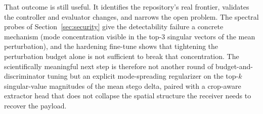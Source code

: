 \documentclass[journal]{IEEEtran}
\begin{document}
That outcome is still useful. It identifies the repository's real frontier, validates the controller and evaluator changes, and narrows the open problem. The spectral probes of Section~\ref{sec:security} give the detectability failure a concrete mechanism (mode concentration visible in the top-3 singular vectors of the mean perturbation), and the hardening fine-tune shows that tightening the perturbation budget alone is not sufficient to break that concentration. The scientifically meaningful next step is therefore not another round of budget-and-discriminator tuning but an explicit mode-spreading regularizer on the top-$k$ singular-value magnitudes of the mean stego delta, paired with a crop-aware extractor head that does not collapse the spatial structure the receiver needs to recover the payload.


\end{document}
